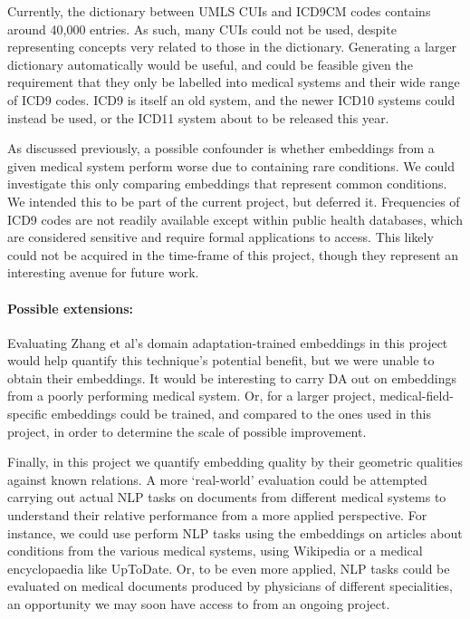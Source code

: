 \documentclass[11pt,a4paper]{article}
\begin{document}
Currently, the dictionary between UMLS CUIs and ICD9CM codes contains around 40,000 entries. As such, many CUIs could not be used, despite representing concepts very related to those in the dictionary. Generating a larger dictionary automatically would be useful, and could be feasible given the requirement that they only be labelled into medical systems and their wide range of ICD9 codes. ICD9 is itself an old system, and the newer ICD10 systems could instead be used, or the ICD11 system about to be released this year.  

As discussed previously, a possible confounder is whether embeddings from a given medical system perform worse due to containing rare conditions. We could investigate this only comparing embeddings that represent common conditions. We intended this to be part of the current project, but deferred it. Frequencies of ICD9 codes are not readily available except within public health databases, which are considered sensitive and require formal applications to access. This likely could not be acquired in the time-frame of this project, though they represent an interesting avenue for future work. 
 
\paragraph{Possible extensions:}
Evaluating Zhang et al's domain adaptation-trained embeddings in this project would help quantify this technique's potential benefit, but we were unable to obtain their embeddings. It would be interesting to carry DA out on embeddings from a poorly performing medical system. Or, for a larger project, medical-field-specific embeddings could be trained, and compared to the ones used in this project, in order to determine the scale of possible improvement. 

Finally, in this project we quantify embedding quality by their geometric qualities against known relations. A more `real-world' evaluation could be attempted carrying out actual NLP tasks on documents from different medical systems to understand their relative performance from a more applied perspective. For instance, we could use perform NLP tasks using the embeddings on articles about conditions from the various medical systems, using Wikipedia or a medical encyclopaedia like UpToDate. Or, to be even more applied, NLP tasks could be evaluated on medical documents produced by physicians of different specialities, an opportunity we may soon have access to from an ongoing project. 
\end{document}
